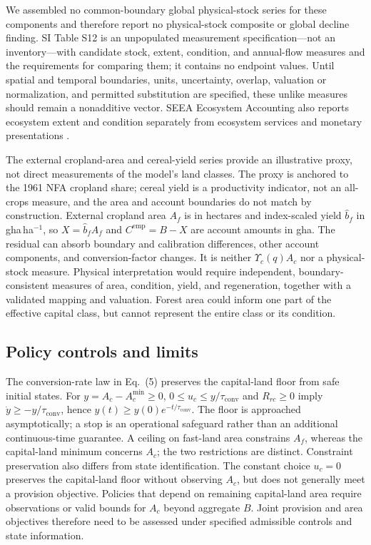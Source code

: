 \documentclass[preprint,12pt,authoryear]{elsarticle}
\newcommand{\Ups}{\Upsilon_c}
\newcommand{\Acmin}{A_c^{\min}}
\newcommand{\tconv}{\tau_{\mathrm{conv}}}
\begin{document}
We assembled no common-boundary global physical-stock series for these components and therefore report no physical-stock composite or global decline finding. SI Table S12 is an unpopulated measurement specification—not an inventory—with candidate stock, extent, condition, and annual-flow measures and the requirements for comparing them; it contains no endpoint values. Until spatial and temporal boundaries, units, uncertainty, overlap, valuation or normalization, and permitted substitution are specified, these unlike measures should remain a nonadditive vector. SEEA Ecosystem Accounting also reports ecosystem extent and condition separately from ecosystem services and monetary presentations \citep{UN2021SEEA_EA}.

The external cropland-area and cereal-yield series provide an illustrative proxy, not direct measurements of the model's land classes. The proxy is anchored to the 1961 NFA cropland share; cereal yield is a productivity indicator, not an all-crops measure, and the area and account boundaries do not match by construction. External cropland area $A_f$ is in hectares and index-scaled yield $\hat b_f$ in gha\,ha$^{-1}$, so $X=\hat b_fA_f$ and $C^{\mathrm{emp}}=B-X$ are account amounts in gha. The residual can absorb boundary and calibration differences, other account components, and conversion-factor changes. It is neither $\Ups(q)A_c$ nor a physical-stock measure. Physical interpretation would require independent, boundary-consistent measures of area, condition, yield, and regeneration, together with a validated mapping and valuation. Forest area could inform one part of the effective capital class, but cannot represent the entire class or its condition.

\subsection{Policy controls and limits}

The conversion-rate law in Eq.~(5) preserves the capital-land floor from safe initial states. For $y=A_c-\Acmin\ge0$, $0\le u_c\le y/\tconv$ and $R_{rc}\ge0$ imply $\dot y\ge-y/\tconv$, hence $y(t)\ge y(0)e^{-t/\tconv}$. The floor is approached asymptotically; a stop is an operational safeguard rather than an additional continuous-time guarantee. A ceiling on fast-land area constrains $A_f$, whereas the capital-land minimum concerns $A_c$; the two restrictions are distinct. Constraint preservation also differs from state identification. The constant choice $u_c=0$ preserves the capital-land floor without observing $A_c$, but does not generally meet a provision objective. Policies that depend on remaining capital-land area require observations or valid bounds for $A_c$ beyond aggregate $B$. Joint provision and area objectives therefore need to be assessed under specified admissible controls and state information.
\end{document}
